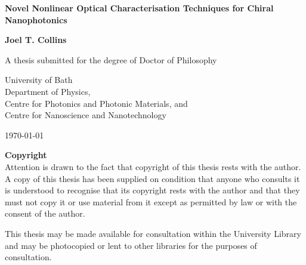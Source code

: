 \begin{center}
    \vspace*{1cm}
    
    \LARGE
    \textbf{Novel Nonlinear Optical Characterisation Techniques for Chiral Nanophotonics}
    
    \vspace{0.5cm}
    \large
    \textbf{Joel T. Collins}
    
    \vspace{1.5cm}
    \normalsize
    A thesis submitted for the degree of Doctor of Philosophy
    
    \vspace{0.8cm}
    University of Bath\\
    Department of Physics,\\
    Centre for Photonics and Photonic Materials, and\\
    Centre for Nanoscience and Nanotechnology
    
    \vspace{0.5cm}
    \today
    
    \vspace{1.5cm}

    \textbf{Copyright}\\
    Attention is drawn to the fact that copyright of this thesis rests with the author. A copy of this thesis has been supplied on condition that anyone who consults it is understood to recognise that its copyright rests with the author and that they must not copy it or use material from it except as permitted by law or with the consent of the author. 

    \vspace{1.5cm}

    This thesis may be made available for consultation within the University Library and may be photocopied or lent to other libraries for the purposes of consultation. 



\end{center}